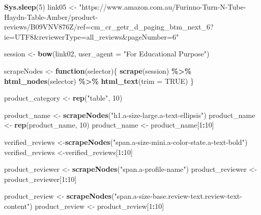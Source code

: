 \documentclass[
]{article}
\newenvironment{Shaded}{\begin{snugshade}}{\end{snugshade}}
\newcommand{\AttributeTok}[1]{\textcolor[rgb]{0.13,0.29,0.53}{#1}}
\newcommand{\ConstantTok}[1]{\textcolor[rgb]{0.56,0.35,0.01}{#1}}
\newcommand{\ControlFlowTok}[1]{\textcolor[rgb]{0.13,0.29,0.53}{\textbf{#1}}}
\newcommand{\DecValTok}[1]{\textcolor[rgb]{0.00,0.00,0.81}{#1}}
\newcommand{\FunctionTok}[1]{\textcolor[rgb]{0.13,0.29,0.53}{\textbf{#1}}}
\newcommand{\NormalTok}[1]{#1}
\newcommand{\OtherTok}[1]{\textcolor[rgb]{0.56,0.35,0.01}{#1}}
\newcommand{\SpecialCharTok}[1]{\textcolor[rgb]{0.81,0.36,0.00}{\textbf{#1}}}
\newcommand{\StringTok}[1]{\textcolor[rgb]{0.31,0.60,0.02}{#1}}
\begin{document}
\begin{Shaded}
\begin{Highlighting}[]
   \FunctionTok{Sys.sleep}\NormalTok{(}\DecValTok{5}\NormalTok{)}
\NormalTok{link05 }\OtherTok{\textless{}{-}} \StringTok{"https://www.amazon.com.au/Furinno{-}Turn{-}N{-}Tube{-}Haydn{-}Table{-}Amber/product{-}reviews/B09VNV876Z/ref=cm\_cr\_getr\_d\_paging\_btm\_next\_6?ie=UTF8\&reviewerType=all\_reviews\&pageNumber=6"}


\NormalTok{  session }\OtherTok{\textless{}{-}} \FunctionTok{bow}\NormalTok{(link02,}
               \AttributeTok{user\_agent =} \StringTok{"For Educational Purpose"}\NormalTok{)}

\NormalTok{  scrapeNodes }\OtherTok{\textless{}{-}} \ControlFlowTok{function}\NormalTok{(selector)\{}
    \FunctionTok{scrape}\NormalTok{(session) }\SpecialCharTok{\%\textgreater{}\%}
      \FunctionTok{html\_nodes}\NormalTok{(selector) }\SpecialCharTok{\%\textgreater{}\%}
      \FunctionTok{html\_text}\NormalTok{(}\AttributeTok{trim =} \ConstantTok{TRUE}\NormalTok{)}
\NormalTok{  \}}

\NormalTok{  product\_category }\OtherTok{\textless{}{-}} \FunctionTok{rep}\NormalTok{(}\StringTok{"table"}\NormalTok{, }\DecValTok{10}\NormalTok{)}

\NormalTok{  product\_name }\OtherTok{\textless{}{-}} \FunctionTok{scrapeNodes}\NormalTok{(}\StringTok{"h1.a{-}size{-}large.a{-}text{-}ellipsis"}\NormalTok{)}
\NormalTok{  product\_name }\OtherTok{\textless{}{-}} \FunctionTok{rep}\NormalTok{(product\_name, }\DecValTok{10}\NormalTok{)}
\NormalTok{  product\_name }\OtherTok{\textless{}{-}}\NormalTok{ product\_name[}\DecValTok{1}\SpecialCharTok{:}\DecValTok{10}\NormalTok{]}
  
\NormalTok{  verified\_reviews }\OtherTok{\textless{}{-}}\FunctionTok{scrapeNodes}\NormalTok{(}\StringTok{"span.a{-}size{-}mini.a{-}color{-}state.a{-}text{-}bold"}\NormalTok{)}
\NormalTok{  verified\_reviews }\OtherTok{\textless{}{-}}\NormalTok{verified\_reviews[}\DecValTok{1}\SpecialCharTok{:}\DecValTok{10}\NormalTok{]}
  
\NormalTok{  product\_reviewer }\OtherTok{\textless{}{-}} \FunctionTok{scrapeNodes}\NormalTok{(}\StringTok{"span.a{-}profile{-}name"}\NormalTok{)}
\NormalTok{  product\_reviewer }\OtherTok{\textless{}{-}}\NormalTok{ product\_reviewer[}\DecValTok{1}\SpecialCharTok{:}\DecValTok{10}\NormalTok{]}
  
\NormalTok{  product\_review }\OtherTok{\textless{}{-}} \FunctionTok{scrapeNodes}\NormalTok{(}\StringTok{"span.a{-}size{-}base.review{-}text.review{-}text{-}content"}\NormalTok{)}
\NormalTok{  product\_review }\OtherTok{\textless{}{-}}\NormalTok{ product\_review[}\DecValTok{1}\SpecialCharTok{:}\DecValTok{10}\NormalTok{]}
  

\end{Highlighting}
\end{Shaded}
\end{document}
